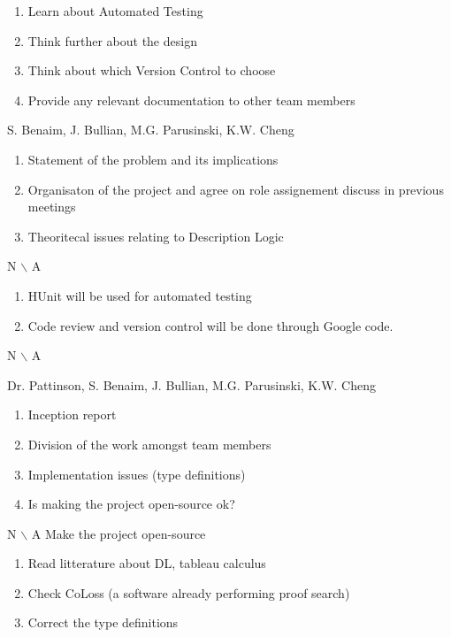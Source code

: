 { \begin{enumerate}\item Learn about Automated Testing
\item Think further about the design
\item Think about which Version Control to choose
\item Provide any relevant documentation to other team members
\end{enumerate}}

%
{S. Benaim, J. Bullian, M.G. Parusinski, K.W. Cheng}%
{ \begin{enumerate} \item Statement of the problem and its implications 
 \item Organisaton of the project and agree on role assignement discuss in 
previous meetings
\item Theoritecal issues relating to Description Logic
\end{enumerate} }%
{ N $\backslash$ A}%
{ \begin{enumerate}
\item HUnit will be used for automated testing
\item Code review and version control will be done through Google code. 
\end{enumerate}}%
{N $\backslash$ A}

%
{Dr. Pattinson, S. Benaim, J. Bullian, M.G. Parusinski, K.W. Cheng}%
{ \begin{enumerate} \item Inception report
\item Division of the work amongst team members
\item Implementation issues (type definitions)
\item Is making the project open-source ok?
\end{enumerate} }%
{ N $\backslash$ A}%
{Make the project open-source}
{ \begin{enumerate}
\item Read litterature about DL, tableau calculus
\item Check CoLoss (a software already performing proof search)
\item Correct the type definitions 
\end{enumerate}}%

